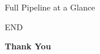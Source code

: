 \documentclass[aspectratio=169]{beamer}
\begin{document}
\begin{frame}{Full Pipeline at a Glance}
\end{frame}

\begin{frame}{END}
\Large
\begin{center}
\textbf{Thank You}
\end{center}
\end{frame}
\end{document}
